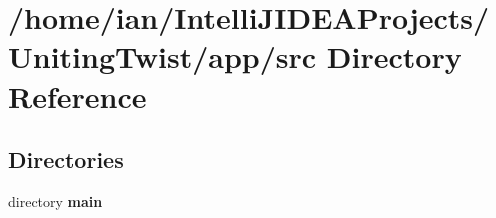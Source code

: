 \section{/home/ian/\+Intelli\+J\+I\+D\+E\+A\+Projects/\+Uniting\+Twist/app/src Directory Reference}
\label{dir_f3fb819b78341f2577095edd78250515}
\subsection*{Directories}
\begin{DoxyCompactItemize}
\item 
directory \textbf{ main}
\end{DoxyCompactItemize}
